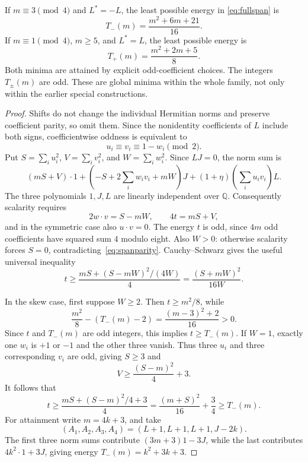 \begin{theorem}\label{thm:spanfloor}
If $m\equiv3\pmod4$ and $L^*=-L$, the least possible energy in
\eqref{eq:fullspan} is
\[
 T_-(m)=\frac{m^2+6m+21}{16}.
\]
If $m\equiv1\pmod4$, $m\ge5$, and $L^*=L$, the least possible energy is
\[
 T_+(m)=\frac{m^2+2m+5}{8}.
\]
Both minima are attained by explicit odd-coefficient choices. The
integers $T_\pm(m)$ are odd. These are global minima within the whole
family, not only within the earlier special constructions.
\end{theorem}
\begin{proof}
Shifts do not change the individual Hermitian norms and preserve
coefficient parity, so omit them. Since the nonidentity coefficients
of $L$ include both signs, coefficientwise oddness is equivalent to
\begin{equation}\label{eq:spanparity}
 u_i\equiv v_i\equiv1-w_i\pmod2.
\end{equation}
Put $S=\sum_i u_i^2$, $V=\sum_i v_i^2$, and $W=\sum_i w_i^2$.
Since $LJ=0$, the norm sum is
\[
 (mS+V)\cdot1+
 \left(-S+2\sum_iw_iv_i+mW\right)J
 +(1+\eta)\left(\sum_i u_iv_i\right)L.
\]
The three polynomials $1,J,L$ are linearly independent over $\mathbb Q$.
Consequently scalarity requires
\begin{equation}\label{eq:spanconditions}
 2w\mathbin{\cdot}v=S-mW,\qquad 4t=mS+V,
\end{equation}
and in the symmetric case also $u\mathbin{\cdot}v=0$.
The energy $t$ is odd, since $4m$ odd coefficients have squared sum
$4$ modulo eight. Also $W>0$: otherwise scalarity forces $S=0$,
contradicting~\eqref{eq:spanparity}. Cauchy--Schwarz gives the useful
universal inequality
\begin{equation}\label{eq:spanCS}
 t\ge\frac{mS+(S-mW)^2/(4W)}4
   =\frac{(S+mW)^2}{16W}.
\end{equation}

In the skew case, first suppose $W\ge2$. Then $t\ge m^2/8$, while
\[
 \frac{m^2}{8}-(T_-(m)-2)
 =\frac{(m-3)^2+2}{16}>0.
\]
Since $t$ and $T_-(m)$ are odd integers, this implies $t\ge T_-(m)$.
If $W=1$, exactly one $w_i$ is $+1$ or $-1$ and the other three
vanish. Thus three $u_i$ and three corresponding $v_i$ are odd,
giving $S\ge3$ and
\[
 V\ge\frac{(S-m)^2}{4}+3.
\]
It follows that
\[
 t\ge\frac{mS+(S-m)^2/4+3}{4}
 =\frac{(m+S)^2}{16}+\frac34
 \ge T_-(m).
\]
For attainment write $m=4k+3$, and take
\[
 (A_1,A_2,A_3,A_4)=(L+1,L+1,L+1,J-2k).
\]
The first three norm sums contribute $(3m+3)1-3J$, while the last
contributes $4k^2\cdot1+3J$, giving energy $T_-(m)=k^2+3k+3$.


\end{proof}
